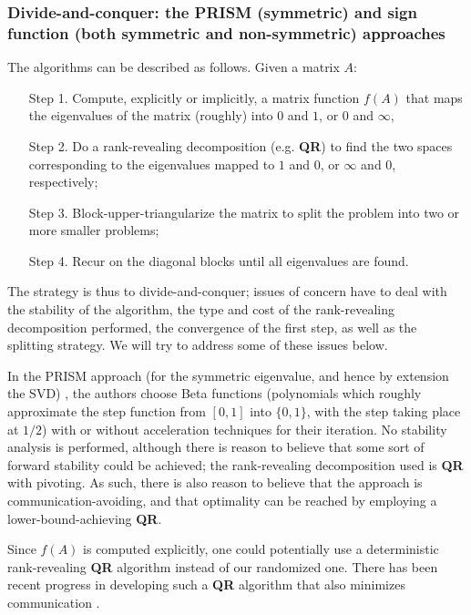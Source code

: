 \documentclass{article}
\theoremstyle{definition}
\begin{document}
\subsubsection{Divide-and-conquer: the PRISM (symmetric) and sign function (both symmetric and non-symmetric) approaches}

The algorithms \cite{bischofledermansuntsao,godunov86,bulgakov88,malyshev93} can be described as follows. Given a matrix $A$:
\begin{enumerate}
\item[Step 1.] Compute, explicitly or implicitly, a matrix function $f(A)$  
that maps the eigenvalues of the matrix (roughly) into $0$ and $1$, or $0$ and $\infty$, 
\item[Step 2.] Do a rank-revealing decomposition (e.g. \textbf{QR}) to find the two spaces 
corresponding to the eigenvalues mapped to $1$ and $0$, or $\infty$ and $0$, respectively;
\item[Step 3.] Block-upper-triangularize the matrix to split the problem into two or more smaller problems;
\item[Step 4.] Recur on the diagonal blocks until all eigenvalues are found.
\end{enumerate}

The strategy is thus to divide-and-conquer; issues of concern have to deal with the stability of the algorithm, the type and cost of the rank-revealing decomposition performed, the convergence of the first step, as well as the splitting strategy. We will try to address some of these issues below.

In the PRISM approach (for the symmetric eigenvalue, and hence by extension the SVD) \cite{bischofledermansuntsao}, the authors choose Beta functions (polynomials which roughly approximate the step function from $[0,1]$ into $\{0,1\}$, with the step taking place at $1/2$) with or without acceleration techniques for their iteration. No stability analysis is performed, although there is reason to believe that some sort of forward stability could be achieved; the rank-revealing decomposition used is \textbf{QR} with pivoting. As such, there is also reason to believe that the approach is communication-avoiding, and that optimality can be reached by employing a lower-bound-achieving \textbf{QR}. 

Since $f(A)$ is computed explicitly, one could potentially use a deterministic rank-revealing \textbf{QR} algorithm instead of our randomized one. There has been recent progress in developing such a \textbf{QR} algorithm that also minimizes communication \cite{BDGGX10}.
\end{document}
